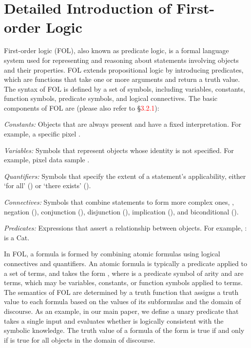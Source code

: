 \documentclass[10pt,twocolumn,letterpaper]{article}
\begin{document}
\section{Detailed Introduction of First-order Logic}\label{sec:fol}

First-order logic (FOL), also known as predicate logic, is a formal language system used for representing and reasoning about statements involving objects and their properties. FOL extends propositional logic by introducing predicates, which are functions that take one or more arguments and return a truth value.
The syntax of FOL is defined by a set of symbols, including variables, constants, function symbols, predicate symbols, and logical connectives. The basic components of FOL are (please also refer to \S\textcolor{red}{3.2.1}):

\noindent \textit{Constants:} Objects that are always present and have a fixed interpretation. For example, a specific pixel .

\noindent \textit{Variables:} Symbols that represent objects whose identity is not specified. For example, pixel data sample .

\noindent \textit{Quantifiers:} Symbols that specify the extent of a statement's applicability, either `for all' () or `there exists' ().

\noindent \textit{Connectives:} Symbols that combine statements to form more complex ones, \eg, negation (), conjunction (), disjunction (), implication (), and biconditional ().

\noindent \textit{Predicates:} Expressions that assert a relationship between objects. For example, :  is a Cat.

In FOL, a formula is formed by combining atomic formulas using logical connectives and quantifiers. An atomic formula is typically a predicate applied to a set of terms, and takes the form , where  is a predicate symbol of arity  and  are terms, which may be variables, constants, or function symbols applied to terms.
The semantics of FOL are determined by a truth function that assigns a truth value to each formula based on the values of its subformulas and the domain of discourse. As an example, in our main paper, we define a unary predicate  that takes a single input  and evaluates whether  is logically consistent with the symbolic knowledge. The truth value of a formula of the form  is true if and only if  is true for all objects in the domain of discourse.
\end{document}

